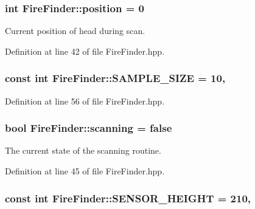 \hypertarget{classFireFinder_a40e204a2807939b3195024f14a9278fc}{
\subsubsection[{position}]{\setlength{\rightskip}{0pt plus 5cm}int Fire\-Finder\-::position = 0\hspace{0.3cm}{\ttfamily [private]}}}\label{classFireFinder_a40e204a2807939b3195024f14a9278fc}


Current position of head during scan. 



Definition at line 42 of file Fire\-Finder.\-hpp.

\hypertarget{classFireFinder_a2136ca4e2438b84b0f4f3864697d51b1}{
\subsubsection[{S\-A\-M\-P\-L\-E\-\_\-\-S\-I\-Z\-E}]{\setlength{\rightskip}{0pt plus 5cm}const int Fire\-Finder\-::\-S\-A\-M\-P\-L\-E\-\_\-\-S\-I\-Z\-E = 10\hspace{0.3cm}{\ttfamily [static]}, {\ttfamily [private]}}}\label{classFireFinder_a2136ca4e2438b84b0f4f3864697d51b1}


Definition at line 56 of file Fire\-Finder.\-hpp.

\hypertarget{classFireFinder_aec1a3ae4b80847a907898601c64386cb}{
\subsubsection[{scanning}]{\setlength{\rightskip}{0pt plus 5cm}bool Fire\-Finder\-::scanning = false\hspace{0.3cm}{\ttfamily [private]}}}\label{classFireFinder_aec1a3ae4b80847a907898601c64386cb}


The current state of the scanning routine. 



Definition at line 45 of file Fire\-Finder.\-hpp.

\hypertarget{classFireFinder_ab145c886fc3edcc215a5673bf4874b13}{
\subsubsection[{S\-E\-N\-S\-O\-R\-\_\-\-H\-E\-I\-G\-H\-T}]{\setlength{\rightskip}{0pt plus 5cm}const int Fire\-Finder\-::\-S\-E\-N\-S\-O\-R\-\_\-\-H\-E\-I\-G\-H\-T = 210\hspace{0.3cm}{\ttfamily [static]}, {\ttfamily [private]}}}\label{classFireFinder_ab145c886fc3edcc215a5673bf4874b13}


